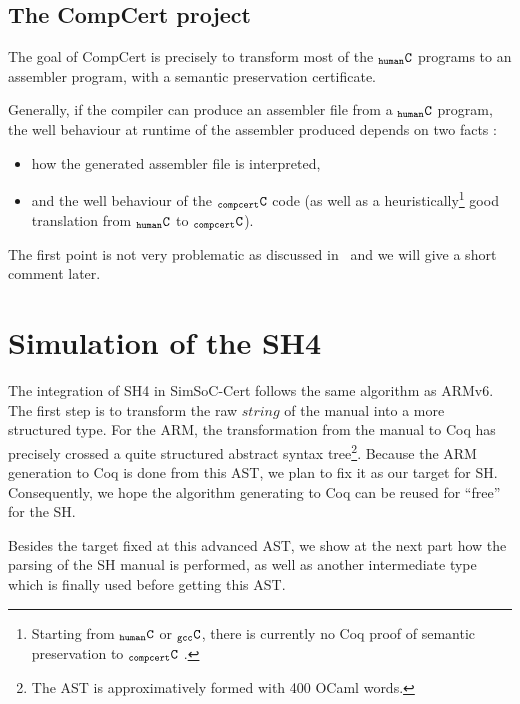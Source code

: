 \documentclass[a4paper, 11pt]{article}
\newcommand{\simgen}{{\tt simgen}\xspace}
\newcommand{\C}{$_{\tt compcert}{\tt C}$\xspace}
\newcommand{\gccC}{$_{\tt gcc}{\tt C}$\xspace}
\newcommand{\hC}{$_{\tt human}{\tt C}$\xspace}
\newcommand{\SScert}{SimSoC-Cert\xspace}
\begin{document}
\subsection{The CompCert project}
The goal of CompCert is precisely to transform most of the \hC programs to an assembler program, with a semantic preservation certificate. 

Generally, if the compiler can produce an assembler file from a \hC program, the well behaviour at runtime of the assembler produced depends on two facts :
\begin{itemize}
\item how the generated assembler file is interpreted,
\item and the well behaviour of the \C code (as well as a heuristically\footnote{Starting from \hC or \gccC, there is currently no Coq proof of semantic preservation to \C%
. } good translation from \hC to \C).
\end{itemize}
The first point is not very problematic as discussed in~\cite{Leroy-Compcert-CACM} and we will give a short comment later.

\section{Simulation of the SH4}
\label{s:simu_sh4}

The integration of SH4 in \SScert follows the same algorithm as ARMv6. The first step is to transform the raw $string$ of the manual into a more structured type. For the ARM, the transformation from the manual to Coq has precisely crossed a quite structured abstract syntax tree\footnote{The AST is approximatively formed with 400 OCaml words.}. Because the ARM generation to Coq is done from this AST, we plan to fix it as our target for SH. Consequently, we hope the algorithm generating to Coq can be reused for ``free'' for the SH.

\hspace{1ex}

Besides the target fixed at this advanced AST, we show at the next part how the parsing of the SH manual is performed, as well as another intermediate type which is finally used before getting this AST.
\end{document}
